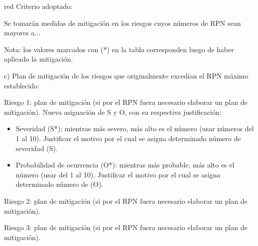 \begin{consigna}{red}
Criterio adoptado: 

Se tomarán medidas de mitigación en los riesgos cuyos números de RPN sean mayores a...

Nota: los valores marcados con (*) en la tabla corresponden luego de haber aplicado la mitigación.

c) Plan de mitigación de los riesgos que originalmente excedían el RPN máximo establecido:
 
Riesgo 1: plan de mitigación (si por el RPN fuera necesario elaborar un plan de mitigación).
  Nueva asignación de S y O, con su respectiva justificación:
  \begin{itemize}
	\item Severidad (S*): mientras más severo, más alto es el número (usar números del 1 al 10).
          Justificar el motivo por el cual se asigna determinado número de severidad (S).
	\item Probabilidad de ocurrencia (O*): mientras más probable, más alto es el número (usar del 1 al 10).
          Justificar el motivo por el cual se asigna determinado número de (O).
	\end{itemize}

Riesgo 2: plan de mitigación (si por el RPN fuera necesario elaborar un plan de mitigación).
 
Riesgo 3: plan de mitigación (si por el RPN fuera necesario elaborar un plan de mitigación).

\end{consigna}
